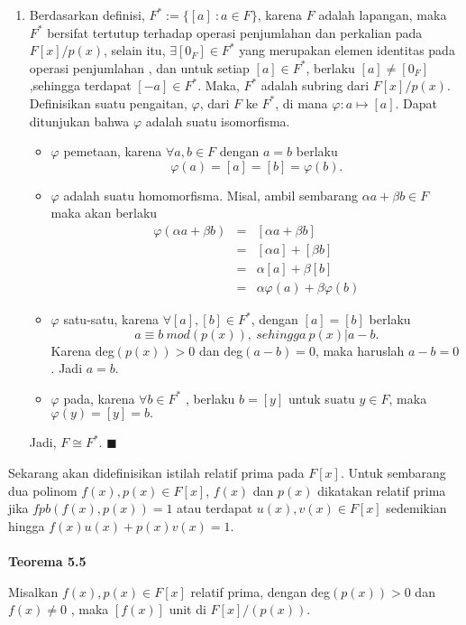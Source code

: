 \begin{enumerate}
	\item Berdasarkan definisi,  $F^* := \{ [a]~:a\in F \}$, karena $F$ adalah lapangan, maka $F^*$ bersifat tertutup terhadap operasi penjumlahan dan perkalian pada $F[x]/p(x)$, selain itu, $\exists [0_F] \in F^*$ yang merupakan elemen identitas pada operasi  				penjumlahan , dan untuk setiap $[a] \in F^*$, berlaku $[a] \ne [0_F]$ ,sehingga terdapat $[-a] \in F^*$. Maka, $F^*$ adalah subring dari $ F[x]/p(x)$.\\
		Definisikan suatu pengaitan, $\varphi$, dari $F$ ke $F^*$, di mana $\varphi : a \mapsto [a]$. Dapat ditunjukan bahwa $\varphi$ adalah suatu isomorfisma. 
		\begin{itemize}
		\item $\varphi$ pemetaan, karena $\forall a,b \in F$ dengan $a=b$ berlaku $$\varphi(a) = [a] = [b] =\varphi(b).$$
		\item $\varphi$ adalah suatu homomorfisma. Misal, ambil sembarang $\alpha a + \beta b \in F$ maka akan berlaku
		$$\begin{array}{rcl}
		\varphi (\alpha a + \beta b) &=& [\alpha a + \beta b]\\
		&=& [\alpha a] + [\beta b]\\
		&=& \alpha[a] +\beta [b]\\
		&=& \alpha \varphi(a) + \beta \varphi(b)
		\end{array}$$
		\item $\varphi$ satu-satu, karena $\forall [a],[b] \in F^*$, dengan $[a]=[b]$ berlaku\\ 
		$$a \equiv b~mod(p(x)), ~sehingga~p(x)|a-b.$$ Karena deg$(p(x)) >0$ dan deg$(a-b) =0$, maka haruslah $a-b = 0$. Jadi $a=b$.
		\item $\varphi$ pada, karena $\forall b\in F^*$ , berlaku $b=[y]$ untuk suatu $y\in F$, maka $\varphi(y)=[y]=b.$
		\end{itemize}
	Jadi, $F\cong F^*.$ $\blacksquare$
	\end{enumerate}
\par 	Sekarang akan didefinisikan istilah relatif prima pada $F[x]$. Untuk sembarang dua polinom $f(x),p(x) \in F[x]$, $f(x)$ dan $p(x)$ dikatakan relatif prima jika $fpb(f(x),p(x)) = 1$ atau terdapat $u(x),v(x) \in F[x]$ sedemikian hingga $f(x)u(x)+p(x)v(x) =1$.
\\
\\
	\textbf{Teorema 5.5}
\par 	Misalkan $f(x),p(x)\in F[x]$ relatif prima, dengan deg$(p(x)) >0$ dan $f(x)\ne 0$ , maka $[f(x)]$ unit di $F[x]/(p(x)).$ \\
